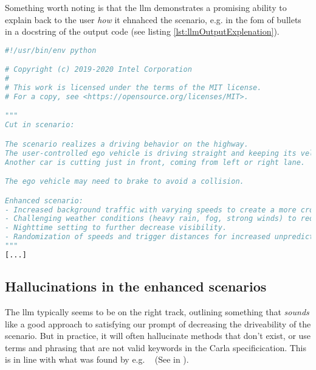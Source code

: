 Something worth noting is that the \acrshort{llm} demonstrates a promising
ability to explain back to the user \emph{how} it ehnahced the scenario, e.g. in
the fom of bullets in a docstring of the output code (see listing \ref{lst:llmOutputExplenation}).

\begin{lstlisting}[caption={Head of an \acrshort{llm}-enhanced scenario, highlighting how the \acrshort{llm} can add an explenation of how it enhanced the scenario.}, label={lst:llmOutputExplenation}, language={Python}]
#!/usr/bin/env python

# Copyright (c) 2019-2020 Intel Corporation
#
# This work is licensed under the terms of the MIT license.
# For a copy, see <https://opensource.org/licenses/MIT>.

"""
Cut in scenario:

The scenario realizes a driving behavior on the highway.
The user-controlled ego vehicle is driving straight and keeping its velocity at a constant level.
Another car is cutting just in front, coming from left or right lane.

The ego vehicle may need to brake to avoid a collision.

Enhanced scenario:
- Increased background traffic with varying speeds to create a more crowded environment.
- Challenging weather conditions (heavy rain, fog, strong winds) to reduce visibility and grip.
- Nighttime setting to further decrease visibility.
- Randomization of speeds and trigger distances for increased unpredictability.
"""
[...]
\end{lstlisting}

\subsection{Hallucinations in the enhanced scenarios}

The \acrshort{llm} typically seems to be on the right track, outlining something
that \emph{sounds} like a good approach to satisfying our prompt of decreasing
the driveability of the scenario. But in practice, it will often hallucinate
methods that don't exist, or use terms and phrasing that are not valid keywords
in the Carla specificication. This is in line with what was found by e.g.
\citeauthor{autoSceneGen}~\cite[14542]{autoSceneGen} (See  in
).

